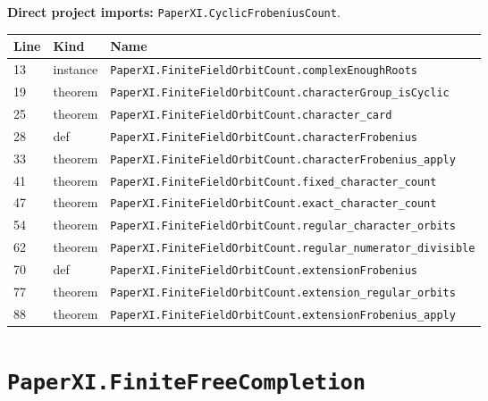 \documentclass[10pt,oneside]{book}
\begin{document}

\textbf{Direct project imports:} \nolinkurl{PaperXI.CyclicFrobeniusCount}.

\begin{longtable}{@{}p{}p{}p{}@{}}\toprule Line&Kind&Name\\\midrule\endhead

13&instance&\nolinkurl{PaperXI.FiniteFieldOrbitCount.complexEnoughRoots}\\

19&theorem&\nolinkurl{PaperXI.FiniteFieldOrbitCount.characterGroup_isCyclic}\\

25&theorem&\nolinkurl{PaperXI.FiniteFieldOrbitCount.character_card}\\

28&def&\nolinkurl{PaperXI.FiniteFieldOrbitCount.characterFrobenius}\\

33&theorem&\nolinkurl{PaperXI.FiniteFieldOrbitCount.characterFrobenius_apply}\\

41&theorem&\nolinkurl{PaperXI.FiniteFieldOrbitCount.fixed_character_count}\\

47&theorem&\nolinkurl{PaperXI.FiniteFieldOrbitCount.exact_character_count}\\

54&theorem&\nolinkurl{PaperXI.FiniteFieldOrbitCount.regular_character_orbits}\\

62&theorem&\nolinkurl{PaperXI.FiniteFieldOrbitCount.regular_numerator_divisible}\\

70&def&\nolinkurl{PaperXI.FiniteFieldOrbitCount.extensionFrobenius}\\

77&theorem&\nolinkurl{PaperXI.FiniteFieldOrbitCount.extension_regular_orbits}\\

88&theorem&\nolinkurl{PaperXI.FiniteFieldOrbitCount.extensionFrobenius_apply}\\

\bottomrule\end{longtable}

\section{\texorpdfstring{\nolinkurl{PaperXI.FiniteFreeCompletion}}{PaperXI.FiniteFreeCompletion}}\label{module:PaperXI.FiniteFreeCompletion}
\end{document}

